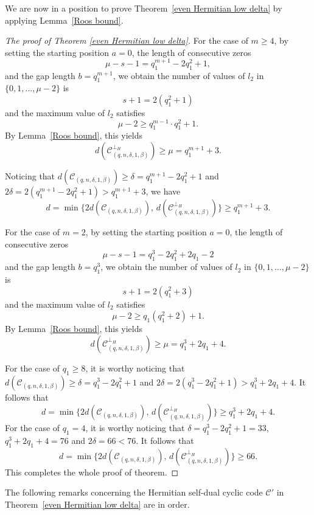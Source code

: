 \documentclass[10pt,a4paper]{amsart}
\begin{document}
We are now in a position to  prove Theorem~\ref{even Hermitian low delta} by  applying Lemma~\ref{Roos bound}.


\begin{proof}[The proof of Theorem \ref{even Hermitian low delta}]
For the case of $m \ge 4$, by setting the starting position $a = 0$, the length of consecutive zeros
\[
\mu - s - 1 = q_1^{m+1} - 2q_1^2 + 1,
\]
and the gap length $b = q_1^{m+1}$, we obtain the number of values of $l_2$ in $\{0,1,\dots,\mu-2\}$ is
\[
s + 1 = 2(q_1^2 + 1)
\]
and the maximum value of $l_2$ satisfies
\[
\mu - 2 \ge q_1^{m-1} \cdot q_1^2 + 1.
\]
By Lemma~\ref{Roos bound}, this yields
\[
d(\mathcal{C}^{\perp_H}_{(q,n,\delta,1,\beta)}) \ge \mu = q_1^{m+1} + 3.
\]

Noticing that $d(\mathcal{C}_{(q,n,\delta,1,\beta)}) \ge \delta = q_1^{m+1} - 2q_1^2 + 1$ and
\(
2\delta = 2(q_1^{m+1} - 2q_1^2 + 1) > q_1^{m+1} + 3
\), we have
\[
d = \min\{2d(\mathcal{C}_{(q,n,\delta,1,\beta)}),\, d(\mathcal{C}_{(q,n,\delta,1,\beta)}^{\perp_H})\} \ge q_1^{m+1} + 3.
\]

For the case of $m = 2$, by setting the starting position $a = 0$, the length of consecutive zeros
\[
\mu - s - 1 = q_1^3 - 2q_1^2 + 2q_1 - 2
\]
and the gap length $b = q_1^3$, we obtain the number of values of $l_2$ in $\{0,1,\dots,\mu-2\}$ is
\[
s + 1 = 2(q_1^2 + 3)
\]
and the maximum value of $l_2$ satisfies
\[
\mu - 2 \ge q_1(q_1^2 + 2) + 1.
\]
By Lemma~\ref{Roos bound}, this yields
\[
d(\mathcal{C}^{\perp_H}_{(q,n,\delta,1,\beta)}) \ge \mu = q_1^3 + 2q_1 + 4.
\]

For the case of $q_1 \ge 8$, it is worthy noticing that $d(\mathcal{C}_{(q,n,\delta,1,\beta)}) \ge \delta = q_1^3 - 2q_1^2 + 1$ and
\(
2\delta = 2(q_1^3 - 2q_1^2 + 1) > q_1^3 + 2q_1 + 4
\). It follows that
\[
d = \min\{2d(\mathcal{C}_{(q,n,\delta,1,\beta)}),\, d(\mathcal{C}_{(q,n,\delta,1,\beta)}^{\perp_H})\} \ge q_1^3 + 2q_1 + 4.
\]
For the case of $q_1 = 4$, it is worthy noticing that $\delta = q_1^3 - 2q_1^2 + 1 = 33$, $q_1^3 + 2q_1 + 4 = 76$ and $2\delta = 66 < 76$. It follows that
\[
d = \min\{2d(\mathcal{C}_{(q,n,\delta,1,\beta)}),\, d(\mathcal{C}_{(q,n,\delta,1,\beta)}^{\perp_H})\} \ge 66.
\]
This completes the whole proof of theorem.
\end{proof}


The following remarks concerning the Hermitian self-dual cyclic code $\mathcal{C}'$ in Theorem~\ref{even Hermitian low delta} are in order.
\end{document}
